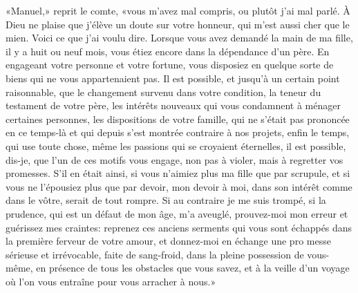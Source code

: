 «Manuel,» reprit le comte, «vous m'avez mal compris, ou plutôt j'ai mal parlé. À Dieu ne plaise que j'élève un doute sur votre honneur, qui m'est aussi cher que le mien. Voici ce que j'ai voulu dire. Lorsque vous avez demandé la main de ma fille, il y a huit ou neuf mois, vous étiez encore dans la dépendance d'un père. En engageant votre personne et votre fortune, vous disposiez en quelque sorte de biens qui ne vous appartenaient pas. Il est possible, et jusqu'à un certain point raisonnable, que le changement survenu dans votre condition, la teneur du testament de votre père, les intérêts nouveaux qui vous condamnent à ménager certaines personnes, les dispositions de votre famille, qui ne s'était pas prononcée en ce temps-là et qui depuis s'est montrée contraire à nos projets, enfin le temps, qui use toute chose, même les passions qui se croyaient éternelles, il est possible, dis-je, que l'un de ces motifs vous engage, non pas à violer, mais à regretter vos promesses. S'il en était ainsi, si vous n'aimiez plus ma fille que par scrupule, et si vous ne l'épousiez plus que par devoir, mon devoir à moi, dans son intérêt comme dans le vôtre, serait de tout rompre. Si au contraire je me suis trompé, si la prudence, qui est un défaut de mon âge, m'a aveuglé, prouvez-moi mon erreur et guérissez mes craintes: reprenez ces anciens serments qui vous sont échappés dans la première ferveur de votre amour, et donnez-moi en échange une pro messe sérieuse et irrévocable, faite de sang-froid, dans la pleine possession de vous-même, en présence de tous les obstacles que vous savez, et à la veille d'un voyage où l'on vous entraîne pour vous arracher à nous.»

